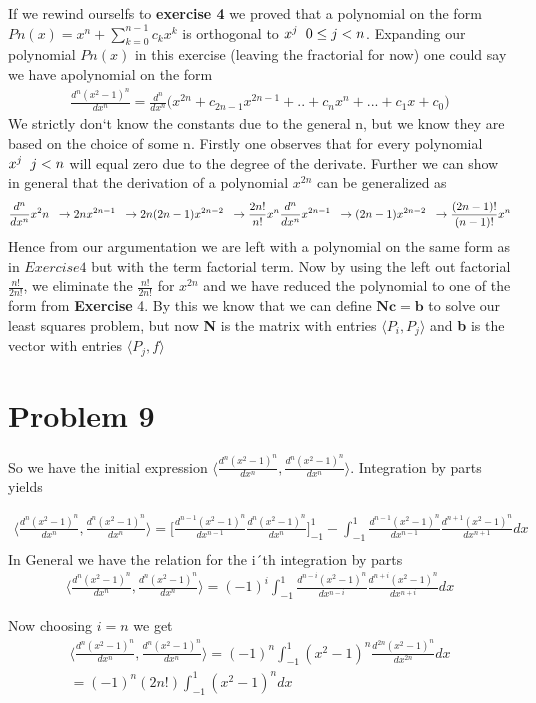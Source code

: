 \documentclass[a4paper,norsk]{article}
\begin{document}
If we rewind ourselfs to \textbf{exercise 4} we proved that a polynomial on the form $Pn(x) = x^n + \sum_{k=0}^{n-1}c_k x^k$ is orthogonal to 
$x^j \hspace{2mm} 0 \leq j < n$. Expanding our polynomial $Pn(x)$ in this exercise (leaving the fractorial for now) one could say we have apolynomial on the form
\begin{align*}
\frac{d^n(x^2-1)^n}{dx^n} = \frac{d^n}{dx^n} \Big(x^{2n} + c_{2n-1}x^{2n-1} + .. + c_{n}x^{n} + ... + c_{1}x + c_{0} \Big)	
\end{align*} 
We strictly don`t know the constants due to the general n, but we know they are based on the choice of some n.
Firstly one observes that for every polynomial $x^j \hspace{2mm} j < n$ will equal zero due to the degree of the derivate. Further we can show in general 
that the derivation of a polynomial $x^{2n}$ can be generalized as 
\begin{align*}
\frac{d^n}{dx^n}x^2n \hspace{2mm} \rightarrow 2nx^{2n-1} \hspace{2mm} \rightarrow 2n(2n-1)x^{2n-2}\hspace{2mm} \rightarrow \frac{2n!}{n!}x^n
\frac{d^n}{dx^n}x^{2n-1} \hspace{2mm} \rightarrow (2n-1)x^{2n-2}\hspace{2mm} \rightarrow \frac{(2n-1)!}{(n-1)!}x^n
\end{align*}
Hence from our argumentation we are left with a polynomial on the same form as in $Exercise 4$ but with the term factorial term. Now by using the left out factorial
$\frac{n!}{2n!}$, we eliminate the $\frac{n!}{2n!}$ for $x^{2n}$ and we have reduced the polynomial to one of the form from \textbf{Exercise} 4. By this we know that we
can define $\mathbf{Nc=b} $ to solve our least squares problem, but now
\textbf{N} is the matrix with entries $\langle P_i, P_j \rangle$ and \textbf{b} is the vector with entries $\langle P_j, f \rangle$ 

\newpage
\section*{Problem 9}
So we have the initial expression $\langle \frac{d^n(x^2 -1 )^n}{dx^n}, \frac{d^n(x^2 -1 )^n}{dx^n} \rangle $. Integration by parts yields

\begin{align*}
\langle \frac{d^n(x^2 -1 )^n}{dx^n}, \frac{d^n(x^2 -1 )^n}{dx^n} \rangle  = 
\Big[ \frac{d^{n-1}(x^2 -1 )^n}{dx^{n-1}} \frac{d^n(x^2 -1 )^n}{dx^n} \Big]_{-1}^1 
- \int_{-1}^1 \frac{d^{n-1}(x^2 -1 )^n}{dx^{n-1}} \frac{d^{n+1}(x^2 -1 )^n}{dx^{n+1}} dx \\
\end{align*}
In General we have the relation for the i´th integration by parts
\begin{align*}
\langle \frac{d^n(x^2 -1 )^n}{dx^n}, \frac{d^n(x^2 -1 )^n}{dx^n} \rangle  = 
(-1)^i \int_{-1}^1 \frac{d^{n-i}(x^2 -1 )^n}{dx^{n-i}} \frac{d^{n+i}(x^2 -1 )^n}{dx^{n+i}} dx
\end{align*}

Now choosing $i = n$ we get 
\begin{align*}
\langle \frac{d^n(x^2 -1 )^n}{dx^n}, \frac{d^n(x^2 -1 )^n}{dx^n} \rangle  = 
(-1)^n \int_{-1}^1 (x^2 -1 )^n \frac{d^{2n}(x^2 -1 )^n}{dx^{2n}} dx \\
 = (-1)^n (2n!) \int_{-1}^1 (x^2 -1 )^ndx
\end{align*}
\end{document}
